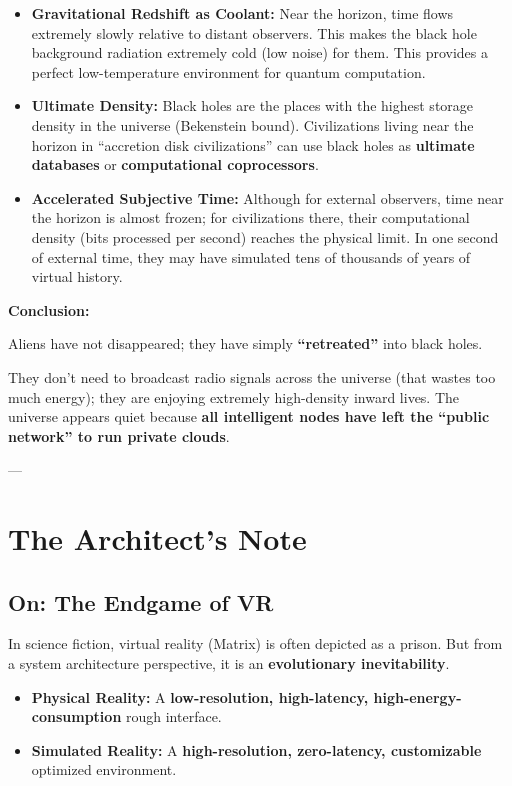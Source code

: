 \begin{itemize}
\item \textbf{Gravitational Redshift as Coolant:} Near the horizon, time flows extremely slowly relative to distant observers. This makes the black hole background radiation extremely cold (low noise) for them. This provides a perfect low-temperature environment for quantum computation.

\item \textbf{Ultimate Density:} Black holes are the places with the highest storage density in the universe (Bekenstein bound). Civilizations living near the horizon in ``accretion disk civilizations'' can use black holes as \textbf{ultimate databases} or \textbf{computational coprocessors}.

\item \textbf{Accelerated Subjective Time:} Although for external observers, time near the horizon is almost frozen; for civilizations there, their computational density (bits processed per second) reaches the physical limit. In one second of external time, they may have simulated tens of thousands of years of virtual history.
\end{itemize}

\textbf{Conclusion:}

Aliens have not disappeared; they have simply \textbf{``retreated''} into black holes.

They don't need to broadcast radio signals across the universe (that wastes too much energy); they are enjoying extremely high-density inward lives. The universe appears quiet because \textbf{all intelligent nodes have left the ``public network'' to run private clouds}.

---

\section{The Architect's Note}

\subsection{On: The Endgame of VR}

In science fiction, virtual reality (Matrix) is often depicted as a prison. But from a system architecture perspective, it is an \textbf{evolutionary inevitability}.

\begin{itemize}
\item \textbf{Physical Reality:} A \textbf{low-resolution, high-latency, high-energy-consumption} rough interface.

\item \textbf{Simulated Reality:} A \textbf{high-resolution, zero-latency, customizable} optimized environment.
\end{itemize}

